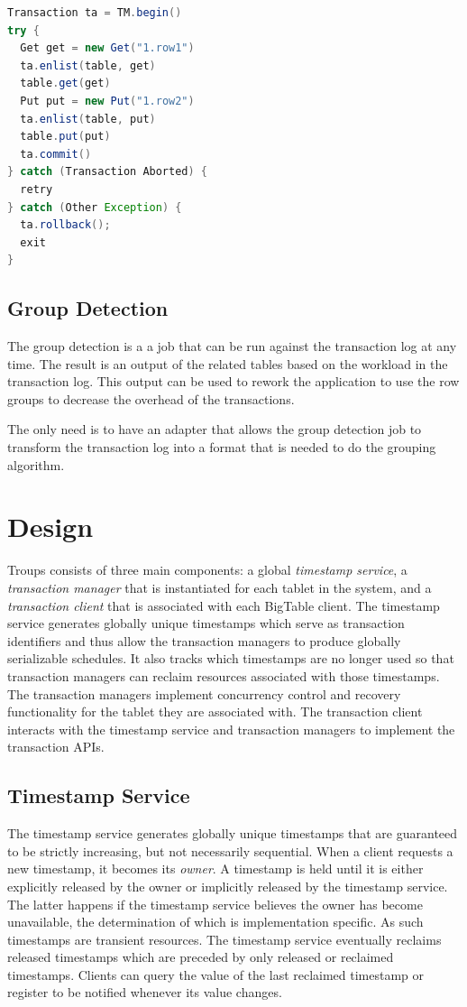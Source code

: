 \documentclass[10pt,final,journal]{IEEEtran}
\begin{document}
\begin{lstlisting}[language=Java,caption=Group Transaction Syntax,float,label=tran,emph={begin,enlist,commit,rollback},emphstyle=\underbar]
Transaction ta = TM.begin()
try {
  Get get = new Get("1.row1")
  ta.enlist(table, get)
  table.get(get)
  Put put = new Put("1.row2")
  ta.enlist(table, put)
  table.put(put)
  ta.commit()
} catch (Transaction Aborted) {
  retry
} catch (Other Exception) {
  ta.rollback();
  exit
}
\end{lstlisting}

\subsection{Group Detection}
The group detection is a a job that can be run against the transaction log at any time.  The result is an output of the related tables based on the workload in the transaction log.  This output can be used to rework the application to use the row groups to decrease the overhead of the transactions.

The only need is to have an adapter that allows the group detection job to transform the transaction log into a format that is needed to do the grouping algorithm.

\section{Design}
Troups consists of three main components: a global \emph{timestamp service}, a \emph{transaction manager} that is instantiated for each tablet in the system, and a \emph{transaction client} that is associated with each BigTable client. The timestamp service generates globally unique timestamps which serve as transaction identifiers and thus allow the transaction managers to produce globally serializable schedules. It also tracks which timestamps are no longer used so that transaction managers can reclaim resources associated with those timestamps. The transaction managers implement concurrency control and recovery functionality for the tablet they are associated with. The transaction client interacts with the timestamp service and transaction managers to implement the transaction APIs.

\subsection{Timestamp Service}
The timestamp service generates globally unique timestamps that are guaranteed to be strictly increasing, but not necessarily sequential. When a client requests a new timestamp, it becomes its \emph{owner}. A timestamp is held until it is either explicitly released by the owner or implicitly released by the timestamp service. The latter happens if the timestamp service believes the owner has become unavailable, the determination of which is implementation specific. As such timestamps are transient resources. The timestamp service eventually reclaims released timestamps which are preceded by only released or reclaimed timestamps. Clients can query the value of the last reclaimed timestamp or register to be notified whenever its value changes.
\end{document}
